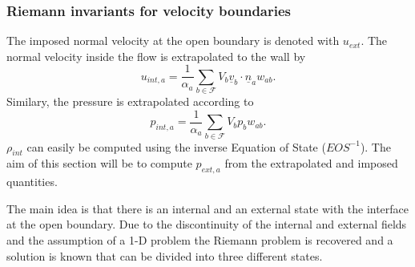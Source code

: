 \documentclass[12pt]{memoir}
\newcommand{\uvec}[1]{\underline{#1}}
\newcommand{\sumF}{\underset{b \in \mathcal{F}}{\sum}}
\begin{document}
\subsubsection{Riemann invariants for velocity boundaries}
\label{h:open:vel}
The imposed normal velocity at the open boundary is denoted with
$u_{ext}$. The normal velocity inside the flow is extrapolated to the wall
by
\begin{equation}
u_{int,a} = \frac{1}{\alpha_a}\sumF V_b \uvec{v}_b \cdot \uvec{n}_a
w_{ab}.
\label{e:open:uint}
\end{equation}
Similary, the pressure is extrapolated according to
\begin{equation}
p_{int,a} = \frac{1}{\alpha_a}\sumF V_b p_b w_{ab}.
\label{e:open:pint}
\end{equation}
$\rho_{int}$ can easily be computed using the inverse Equation of State
($EOS^{-1}$). The aim of this section will be to compute $p_{ext,a}$
from the extrapolated and imposed quantities.

The main idea is that there is an internal and an external state with
the interface at the open boundary. Due to the discontinuity of the
internal and external fields and the assumption of a 1-D problem the
Riemann problem is recovered and a solution is known that can be divided
into three different states.
\end{document}
